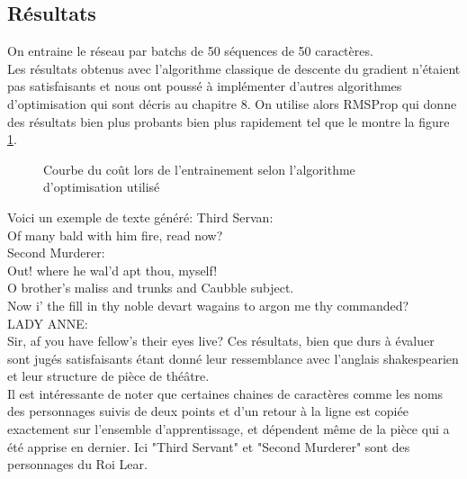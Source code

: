 \subsection{Résultats}

On entraine le réseau par batchs de 50 séquences de 50 caractères.
\\Les résultats obtenus avec l'algorithme classique de descente du gradient n'étaient pas satisfaisants et nous ont poussé à implémenter d'autres algorithmes d'optimisation qui sont décris au chapitre 8. On utilise alors RMSProp qui donne des résultats bien plus probants bien plus rapidement tel que le montre la figure \ref{RMSProp_vs_SGD}.


\begin{figure}[H]
\centering
{}
\caption{Courbe du coût lors de l'entrainement selon l'algorithme d'optimisation utilisé}
\label{RMSProp_vs_SGD}
\end{figure}
\medskip

Voici un exemple de texte généré:
\medbreak
Third Servan:\\
Of many bald with him fire, read now?\\

Second Murderer:\\
Out! where he wal’d apt thou, myself!\\
O brother’s maliss and trunks and Caubble subject.\\
Now i’ the fill in thy noble devart wagains to argon me
thy commanded?\\

LADY ANNE:\\
Sir, af you have fellow’s their eyes live?
\medbreak
Ces résultats, bien que durs à évaluer sont jugés satisfaisants étant donné leur ressemblance avec l'anglais shakespearien et leur structure de pièce de théâtre.
\\Il est intéressante de noter que certaines chaines de caractères comme les noms des personnages suivis de deux points et d'un retour à la ligne est copiée exactement sur l'ensemble d'apprentissage, et dépendent même de la pièce qui a été apprise en dernier. Ici "Third Servant" et "Second Murderer" sont des personnages du Roi Lear.

